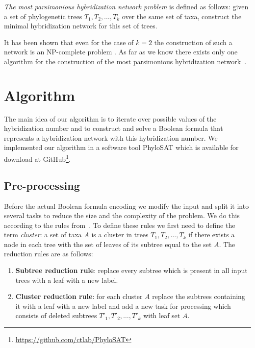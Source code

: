 \documentclass[runningheads, envcountsame, a4paper]{llncs}
\begin{document}
\emph{The most parsimonious hybridization network problem} is defined as follows:
given a set of phylogenetic trees $T_1, T_2, \dots, T_k$ over the same set of taxa, construct the minimal hybridization 
network for this set of trees.

It has been shown that even for the case of $k=2$ the construction of such a network is an NP-complete problem 
\cite {bordewich2007computing}. As far as we know there exists only one algorithm for the construction of the most 
parsimonious hybridization network~\cite{wu2013algorithm}.

\section{Algorithm}

The main idea of our algorithm is to iterate over possible values of the hybridization number and to construct and solve a Boolean 
formula that represents a hybridization network with this hybridization number.
We implemented our algorithm in a software tool PhyloSAT which is available for download at GitHub\footnote{\url{https://github.com/ctlab/PhyloSAT}}.

\subsection{Pre-processing}

Before the actual Boolean formula encoding we modify the input and split it into several tasks to reduce the size 
and the complexity of the problem. We do this according to the rules from~\cite{bonet2009efficiently}. To define these 
rules we first need to define the term \emph{cluster}: a set of taxa $A$ is a cluster in trees $T_1, T_2, \dots, T_k$ if there 
exists a node in each tree with the set of leaves of its subtree equal to the set $A$. The reduction rules are as follows:

\begin{enumerate}

\item \textbf{Subtree reduction rule}:
replace every subtree which is present in all input trees with a leaf with a new label.

\item \textbf{Cluster reduction rule}:
for each cluster $A$ replace the subtrees containing it with a leaf with a new label and add a new task for processing 
which consists of deleted subtrees $T'_1, T'_2, \dots, T'_k$ with leaf set $A$.

\end{enumerate}
\end{document}
